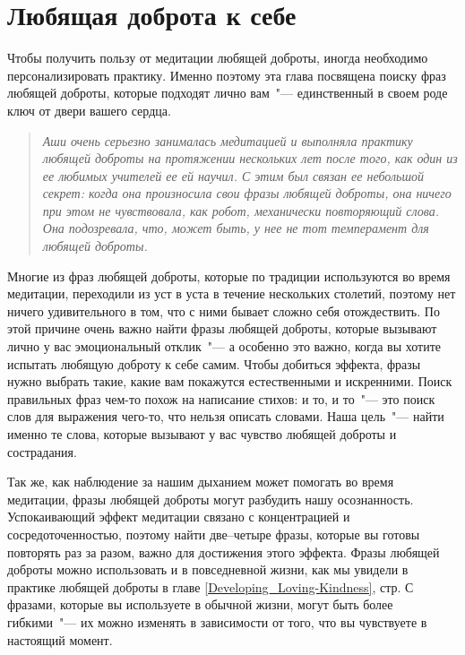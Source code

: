 
\chapter{Любящая доброта к себе} \label{Loving-Kindness_for_Ourselves}

Чтобы получить пользу от медитации любящей доброты, иногда необходимо персонализировать практику. Именно поэтому эта глава посвящена поиску фраз любящей доброты, которые подходят лично вам~"--- единственный в своем роде ключ от двери вашего сердца. 

\begin{quotation}
	\emph{Аши очень серьезно занималась медитацией и выполняла практику любящей доброты на протяжении нескольких лет после того, как один из ее любимых учителей ее ей научил. С этим был связан ее небольшой секрет: когда она произносила свои фразы любящей доброты, она ничего при этом не чувствовала, как робот, механически повторяющий слова. Она подозревала, что, может быть, у нее не тот темперамент для любящей доброты.}
\end{quotation}

Многие из фраз любящей доброты, которые по традиции используются во время медитации, переходили из уст в уста в течение нескольких столетий, поэтому нет ничего удивительного в том, что с ними бывает сложно себя отождествить. По этой причине очень важно найти фразы любящей доброты, которые вызывают лично у вас эмоциональный отклик~"--- а особенно это важно, когда вы хотите испытать любящую доброту к себе самим. Чтобы добиться эффекта, фразы нужно выбрать такие, какие вам покажутся естественными и искренними. Поиск правильных фраз чем-то похож на написание стихов: и то, и то~"--- это поиск слов для выражения чего-то, что нельзя описать словами. Наша цель~"--- найти именно те слова, которые вызывают у вас чувство любящей доброты и сострадания. 

Так же, как наблюдение за нашим дыханием может помогать во время медитации, фразы любящей доброты могут разбудить нашу осознанность. Успокаивающий эффект медитации связано с концентрацией и сосредоточенностью, поэтому найти две--четыре фразы, которые вы готовы повторять раз за разом, важно для достижения этого эффекта. Фразы любящей доброты можно использовать и в повседневной жизни, как мы увидели в практике любящей доброты в главе \ref{Developing_Loving-Kindness}, стр\:\pageref{Developing_Loving-Kindness}. С фразами, которые вы используете в обычной жизни, могут быть более гибкими~"--- их можно изменять в зависимости от того, что вы чувствуете в настоящий момент.

